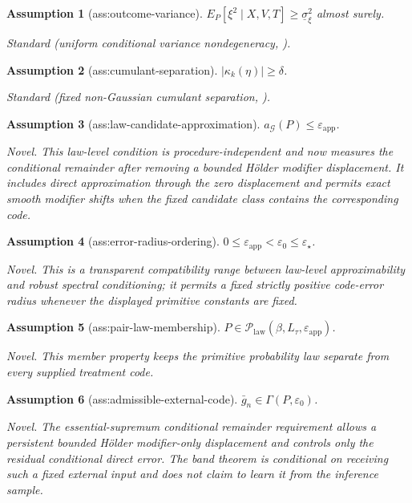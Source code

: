 \documentclass{article}
\newtheorem{assumption}{Assumption}
\begin{document}
\begin{assumption}[ass:outcome-variance]\label{ass:outcome-variance}
\(E_P[\xi^2\mid X,V,T]\ge\underline\sigma_\xi^2\) almost surely.
\par\smallskip\noindent\emph{Standard} (uniform conditional variance nondegeneracy, \cite{ChernozhukovChetverikovKato2014}).
\end{assumption}

\begin{assumption}[ass:cumulant-separation]\label{ass:cumulant-separation}
\(|\kappa_k(\eta)|\ge\delta\).
\par\smallskip\noindent\emph{Standard} (fixed non-Gaussian cumulant separation, \cite{JinMackeySyrgkanis2025}).
\end{assumption}

\begin{assumption}[ass:law-candidate-approximation]\label{ass:law-candidate-approximation}
\(a_{\mathcal G}(P)\le\varepsilon_{\mathrm{app}}\).
\par\smallskip\noindent\emph{Novel.} This law-level condition is procedure-independent and now measures the conditional remainder after removing a bounded Hölder modifier displacement. It includes direct approximation through the zero displacement and permits exact smooth modifier shifts when the fixed candidate class contains the corresponding code.
\end{assumption}

\begin{assumption}[ass:error-radius-ordering]\label{ass:error-radius-ordering}
\(0\le\varepsilon_{\mathrm{app}}<\varepsilon_0\le\varepsilon_\star\).
\par\smallskip\noindent\emph{Novel.} This is a transparent compatibility range between law-level approximability and robust spectral conditioning; it permits a fixed strictly positive code-error radius whenever the displayed primitive constants are fixed.
\end{assumption}

\begin{assumption}[ass:pair-law-membership]\label{ass:pair-law-membership}
\(P\in\mathcal P_{\mathrm{law}}(\beta,L_\tau,\varepsilon_{\mathrm{app}})\).
\par\smallskip\noindent\emph{Novel.} This member property keeps the primitive probability law separate from every supplied treatment code.
\end{assumption}

\begin{assumption}[ass:admissible-external-code]\label{ass:admissible-external-code}
\(\bar g_n\in\Gamma(P,\varepsilon_0)\).
\par\smallskip\noindent\emph{Novel.} The essential-supremum conditional remainder requirement allows a persistent bounded Hölder modifier-only displacement and controls only the residual conditional direct error. The band theorem is conditional on receiving such a fixed external input and does not claim to learn it from the inference sample.
\end{assumption}
\end{document}
